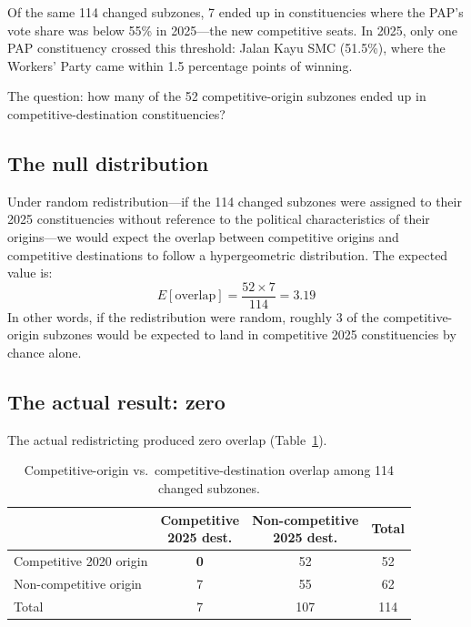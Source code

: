 \documentclass[12pt]{article}
\begin{document}
Of the same 114 changed subzones, 7 ended up in constituencies where the PAP's vote share was
below 55\% in 2025---the new competitive seats. In 2025, only one PAP constituency crossed this
threshold: Jalan Kayu SMC (51.5\%), where the Workers' Party came within 1.5 percentage points of
winning.

The question: how many of the 52 competitive-origin subzones ended up in competitive-destination
constituencies?

\subsection{The null distribution}

Under random redistribution---if the 114 changed subzones were assigned to their 2025
constituencies without reference to the political characteristics of their origins---we would
expect the overlap between competitive origins and competitive destinations to follow a
hypergeometric distribution. The expected value is:
%
\begin{equation}
  E[\text{overlap}] = \frac{52 \times 7}{114} = 3.19
\end{equation}
%
In other words, if the redistribution were random, roughly 3 of the competitive-origin subzones
would be expected to land in competitive 2025 constituencies by chance alone.

\subsection{The actual result: zero}

The actual redistricting produced zero overlap (Table~\ref{tab:contingency}).

\begin{table}[h]
\centering
\caption{Competitive-origin vs.\ competitive-destination overlap among 114 changed subzones.}
\label{tab:contingency}
\begin{tabular}{lccc}
\toprule
 & \makecell{Competitive\\2025 dest.} & \makecell{Non-competitive\\2025 dest.} & Total \\
\midrule
Competitive 2020 origin   & \textbf{0} & 52 & 52 \\
Non-competitive origin    & 7          & 55 & 62 \\
\midrule
Total                     & 7          & 107 & 114 \\
\bottomrule
\end{tabular}
\end{table}
\end{document}
